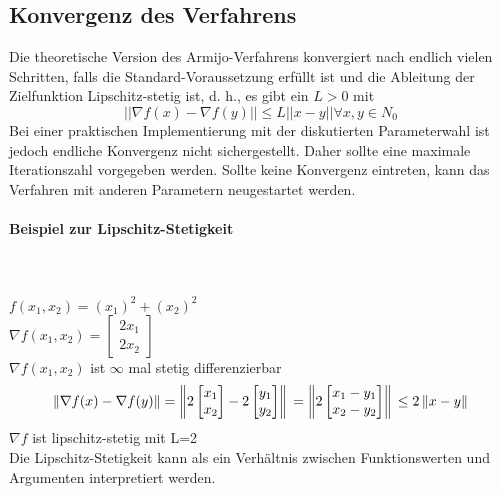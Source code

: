 \subsection{Konvergenz des Verfahrens}

Die theoretische Version des Armijo-Verfahrens konvergiert nach endlich
vielen Schritten, falls die Standard-Voraussetzung erfüllt ist und die
Ableitung der Zielfunktion Lipschitz-stetig ist, d. h., es gibt ein $L > 0$ mit
\begin{equation}
|| \nabla f(x) - \nabla f(y)|| \leq L ||x - y|| \forall x,y \in N_0
\end{equation}
Bei einer praktischen Implementierung mit der diskutierten
Parameterwahl ist jedoch endliche Konvergenz nicht sichergestellt.
Daher sollte eine maximale Iterationszahl vorgegeben werden. Sollte
keine Konvergenz eintreten, kann das Verfahren mit anderen Parametern
neugestartet werden.

\paragraph{Beispiel zur Lipschitz-Stetigkeit}\mbox{}\\
\\
$f(x_1,x_2) = (x_1)^2 + (x_2)^2 $\\
$\nabla f(x_1,x_2) = \begin{bmatrix}2x_1\\2x_2\end{bmatrix}$\\
$\nabla f(x_1,x_2)$ ist $\infty$ mal stetig differenzierbar\\

\begin{equation}
\left\lVert\nabla f(x) - \nabla f(y)\right\rVert = \left\lVert2 \begin{bmatrix}x_1\\x_2\end{bmatrix} -2 \begin{bmatrix}y_1\\y_2\end{bmatrix}\right\rVert\\
= \left\lVert2 \begin{bmatrix}x_1 -y_1\\x_2 - y_2\end{bmatrix}\right\rVert\\
\leq 2 \left\lVert x-y\right\rVert
\end{equation}
$\nabla f$ ist lipschitz-stetig mit L=2\\
Die Lipschitz-Stetigkeit kann als ein Verhältnis zwischen Funktionswerten und Argumenten interpretiert werden.

